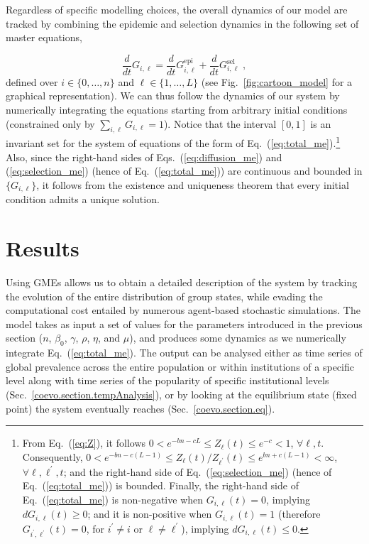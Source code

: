 Regardless of specific modelling choices, the overall dynamics of our model are tracked by combining the epidemic and selection dynamics in the following set of master equations,

\begin{equation}
\label{eq:total_me}
    \frac{d}{dt}G_{i,\ell}= \frac{d}{dt}G_{i,\ell}^{\textrm{epi}} + \frac{d}{dt}G_{i,\ell}^{\textrm{sel}} \; ,
\end{equation}
defined over $i\in\{0,\dots, n\}$ and $\ell\in\{1,\dots, L\}$ (see Fig.~\ref{fig:cartoon_model} for a graphical representation). We can thus follow the dynamics of our system by numerically integrating the equations starting from arbitrary initial conditions (constrained only by $\sum_{i,\ell} G_{i,\ell} = 1$).
Notice that the interval $[0,1]$ is an invariant set for the system of equations of the form of Eq.~(\ref{eq:total_me}).\footnote{From Eq.~(\ref{eq:Z}), it follows $0 < e^{-bn-cL} \leq Z_\ell(t) \leq e^{-c} < 1$, $\forall \ell, t$. Consequently, $0 < e^{-bn-c(L-1)} \leq Z_\ell(t)/Z_{\ell^\prime}(t) \leq e^{bn+c(L-1)} < \infty$, $\forall \ell, \ell^\prime, t$; and the right-hand side of Eq.~(\ref{eq:selection_me}) (hence of Eq.~(\ref{eq:total_me})) is bounded. Finally, the right-hand side of Eq.~(\ref{eq:total_me}) is non-negative when $G_{i,\ell}(t) = 0$, implying $dG_{i,\ell}(t) \geq 0$; and it is non-positive when $G_{i,\ell}(t) = 1$ (therefore $G_{i^\prime,\ell^\prime}(t) = 0$, for $i^\prime \neq i$ or $\ell\neq \ell^\prime$), implying $dG_{i,\ell}(t) \leq 0$.} Also, since the right-hand sides of Eqs.~(\ref{eq:diffusion_me}) and (\ref{eq:selection_me}) (hence of Eq.~(\ref{eq:total_me})) are continuous and bounded in $\{G_{i,\ell}\}$, it follows from the existence and uniqueness theorem that every initial condition admits a unique solution.


\section{Results}
\label{coevo.section.results}

Using GMEs allows us to obtain a detailed description of the system by tracking the evolution of the entire distribution of group states, while evading the computational cost entailed by numerous agent-based stochastic simulations.
The model takes as input a set of values for the parameters introduced in the previous section ($n$, $\beta_0$, $\gamma$, $\rho$, $\eta$, and $\mu$), and produces some dynamics as we numerically integrate Eq.~(\ref{eq:total_me}). The output can be analysed either as time series of global prevalence across the entire population or within institutions of a specific level along with time series of the popularity of specific institutional levels (Sec.~\ref{coevo.section.tempAnalysis}), or by looking at the equilibrium state (fixed point) the system eventually reaches (Sec.~\ref{coevo.section.eq}).

